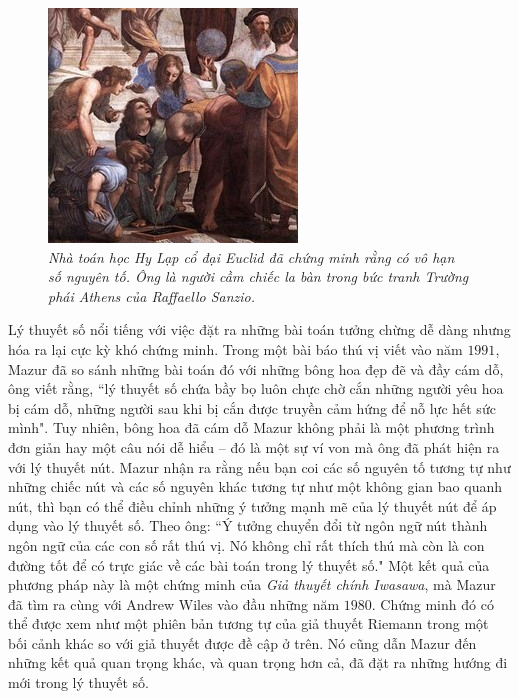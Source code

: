 \begin{multicols}{2}
\begin{figure}[H]
		\includegraphics[width=0.8\linewidth]{3}
		\caption{\small\textit{\color{duongvaotoanhoc}Nhà toán học Hy Lạp cổ đại Euclid đã chứng minh rằng có vô hạn số nguyên tố. Ông là người cầm chiếc la bàn trong bức tranh Trường phái Athens của Raffaello Sanzio.}}
		\vspace*{-10pt}
	\end{figure}
	Lý thuyết số nổi tiếng với việc đặt ra những bài toán tưởng chừng dễ dàng nhưng hóa ra lại cực kỳ khó chứng minh. Trong một bài báo thú vị viết vào năm $1991$, Mazur đã so sánh những bài toán đó với những bông hoa đẹp đẽ và đầy cám dỗ, ông viết rằng, ``lý thuyết số chứa bầy bọ luôn chực chờ cắn những người yêu hoa bị cám dỗ, những người sau khi bị cắn được truyền cảm hứng để nỗ lực hết sức mình".
	\vskip 0.05cm
	Tuy nhiên, bông hoa đã cám dỗ Mazur không phải là một phương trình đơn giản hay một câu nói dễ hiểu -- đó là một sự ví von mà ông đã phát hiện ra với lý thuyết nút. Mazur nhận ra rằng nếu bạn coi các số nguyên tố tương tự như những chiếc nút và các số nguyên khác tương tự như một không gian bao quanh nút, thì bạn có thể điều chỉnh những ý tưởng mạnh mẽ của lý thuyết nút để áp dụng vào lý thuyết số. Theo ông: ``Ý tưởng chuyển đổi từ ngôn ngữ nút thành ngôn ngữ của các con số rất thú vị. Nó không chỉ rất thích thú mà còn là con đường tốt để có trực giác về các bài toán trong lý thuyết số."
	\vskip 0.05cm
	Một kết quả của phương pháp này là một chứng minh của \textit{Giả thuyết chính Iwasawa}, mà Mazur đã tìm ra cùng với Andrew Wiles vào đầu những năm $1980$. Chứng minh đó có thể được xem như một phiên bản tương tự của giả thuyết Riemann trong một bối cảnh khác so với giả thuyết được đề cập ở trên. Nó cũng dẫn Mazur đến những kết quả quan trọng khác, và quan trọng hơn cả, đã đặt ra những hướng đi mới trong lý thuyết số.

\end{multicols}
